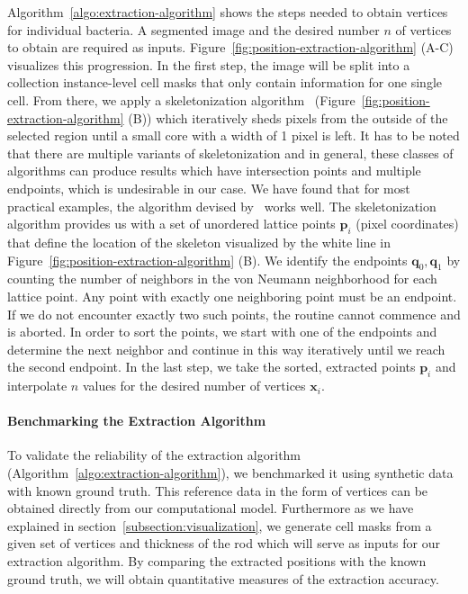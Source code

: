 \documentclass[10pt,letterpaper]{article}
\renewcommand{\vec}[1]{\mathbf{#1}}
\begin{document}
Algorithm~\ref{algo:extraction-algorithm} shows the steps needed to obtain vertices for individual
bacteria.
A segmented image and the desired number $n$ of vertices to obtain are required as inputs.
Figure~\ref{fig:position-extraction-algorithm} (A-C) visualizes this progression.
In the first step, the image will be split into a collection instance-level cell masks that only
contain information for one single cell.
From there, we apply a skeletonization algorithm~\cite{Lee1994}
(Figure~\ref{fig:position-extraction-algorithm} (B)) which iteratively sheds pixels from the outside
of the selected region until a small core with a width of 1 pixel is left.
It has to be noted that there are multiple variants of skeletonization and in general, these classes
of algorithms can produce results which have intersection points and multiple endpoints, which is
undesirable in our case.
We have found that for most practical examples, the algorithm devised by~\cite{Lee1994} works well.
The skeletonization algorithm provides us with a set of unordered lattice points $\vec{p}_i$
(pixel coordinates) that define the location of the skeleton visualized by the white line in
Figure~\ref{fig:position-extraction-algorithm} (B).
We identify the endpoints $\vec{q}_0,\vec{q}_1$ by counting the number of neighbors in the von
Neumann neighborhood for each lattice point.
Any point with exactly one neighboring point must be an endpoint.
If we do not encounter exactly two such points, the routine cannot commence and is aborted.
In order to sort the points, we start with one of the endpoints and determine the next neighbor and
continue in this way iteratively until we reach the second endpoint.
In the last step, we take the sorted, extracted points $\vec{p}_i$ and interpolate $n$ values for
the desired number of vertices $\vec{x}_i$.

\paragraph{Benchmarking the Extraction Algorithm}

To validate the reliability of the extraction algorithm
(Algorithm~\ref{algo:extraction-algorithm}), we benchmarked it using synthetic data with known
ground truth. This reference data in the form of vertices can be obtained directly from our
computational model.
Furthermore as we have explained in section~\ref{subsection:visualization}, we generate cell masks
from a given set of vertices and thickness of the rod which will serve as inputs for our extraction
algorithm. By comparing the extracted positions with the known ground truth, we will obtain
quantitative measures of the extraction accuracy.
\end{document}
